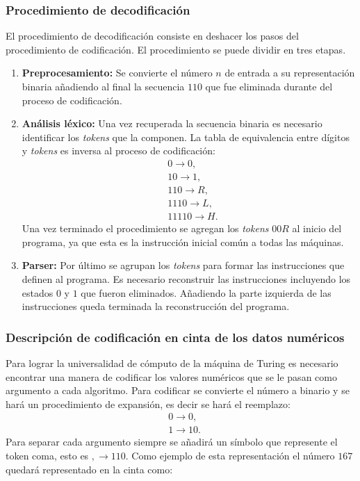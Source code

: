 \documentclass[10pt,a4paper]{article}
\begin{document}
\subsubsection{Procedimiento de decodificación}
El procedimiento de decodificación consiste en deshacer los pasos del procedimiento de codificación. El procedimiento se puede dividir en tres etapas.

\begin{enumerate}
	\item \textbf{Preprocesamiento:} Se convierte el número $n$ de entrada a su representación binaria añadiendo al final la secuencia $110$ que fue eliminada durante del proceso de codificación.
	\item \textbf{Análisis léxico:} Una vez recuperada la secuencia binaria es necesario identificar los \textit{tokens} que la componen. La tabla de equivalencia entre dígitos y \textit{tokens} es inversa al proceso de codificación:
\begin{align*}
	&0 \rightarrow 0,\\
	&10 \rightarrow 1,\\
	&110 \rightarrow R,\\
	&1110 \rightarrow L,\\
	&11110 \rightarrow H.
\end{align*}
Una vez terminado el procedimiento se agregan los \textit{tokens} $00R$ al inicio del programa, ya que esta es la instrucción inicial común a todas las máquinas.
	\item \textbf{Parser:} Por último se agrupan los \textit{tokens} para formar las instrucciones que definen al programa. Es necesario reconstruir las instrucciones incluyendo los estados $0$ y $1$ que fueron eliminados. Añadiendo la parte izquierda de las instrucciones queda terminada la reconstrucción del programa.
\end{enumerate}

\subsubsection{Descripción de codificación en cinta de los datos numéricos}
Para lograr la universalidad de cómputo de la máquina de Turing es necesario encontrar una manera de codificar los valores numéricos que se le pasan como argumento a cada algoritmo. Para codificar se convierte el número a binario y se hará un procedimiento de expansión, es decir se hará el reemplazo:
\begin{align*}
	&0 \rightarrow 0,\\
	&1 \rightarrow 10.
\end{align*}
Para separar cada argumento siempre se añadirá un símbolo que represente el token coma, esto es $, \rightarrow 110$. Como ejemplo de esta representación el número $167$ quedará representado en la cinta como:
\end{document}

